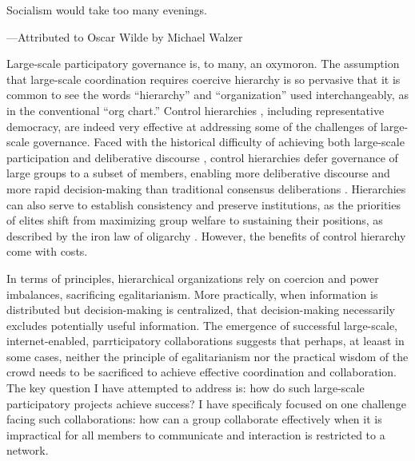 \epigraph
{Socialism would take too many evenings.}
{---Attributed to Oscar Wilde by Michael Walzer \cite{walzer_day_1971} }
Large-scale participatory governance is, to many, an oxymoron.
The assumption that large-scale coordination requires coercive hierarchy is so pervasive that it is common to see the words ``hierarchy'' and ``organization'' used interchangeably, as in the conventional ``org chart.''
Control hierarchies \cite{crumley_heterarchy_1995}, including representative democracy, are indeed very effective at addressing some of the challenges of large-scale governance.
Faced with the historical difficulty of achieving both large-scale participation and deliberative discourse \cite{ackerman_deliberation_2002}, control hierarchies defer governance of large groups to a subset of members, enabling more deliberative discourse and more rapid decision-making than traditional consensus deliberations \cite{gentry_consensus_1982}.
Hierarchies can also serve to establish consistency and preserve institutions, as the priorities of elites shift from maximizing group welfare to sustaining their positions, as described by the iron law of oligarchy \cite{michels_political_1999, shaw_laboratories_2014}.
However, the benefits of control hierarchy come with costs.

In terms of principles, hierarchical organizations rely on coercion and power imbalances, sacrificing egalitarianism.
More practically, when information is distributed but decision-making is centralized,
that decision-making necessarily excludes potentially useful information.
The emergence of successful large-scale, internet-enabled, parrticipatory collaborations suggests that perhaps, at leaast in some cases, neither the principle of egalitarianism nor the practical wisdom of the crowd needs to be sacrificed to achieve effective coordination and collaboration.
The key question I have attempted to address is: how do such large-scale participatory projects achieve success?
I have specificaly focused on one challenge facing such collaborations: how can a group collaborate effectively when it is impractical for all members to communicate and interaction is restricted to a network.

